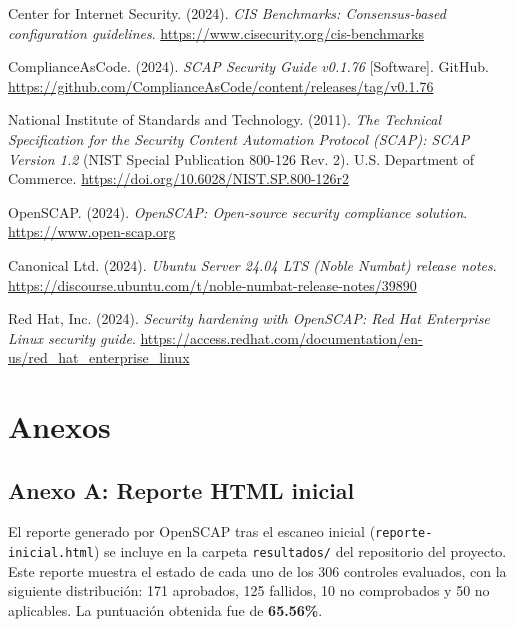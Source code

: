 \documentclass[12pt,letterpaper]{article}
\begin{document}
\begin{flushleft}
\setlength{\parindent}{0pt}
\setlength{\hangindent}{0.5in}

Center for Internet Security. (2024). \textit{CIS Benchmarks: Consensus-based configuration guidelines}. \url{https://www.cisecurity.org/cis-benchmarks}

\medskip

ComplianceAsCode. (2024). \textit{SCAP Security Guide v0.1.76} [Software]. GitHub. \url{https://github.com/ComplianceAsCode/content/releases/tag/v0.1.76}

\medskip

National Institute of Standards and Technology. (2011). \textit{The Technical Specification for the Security Content Automation Protocol (SCAP): SCAP Version 1.2} (NIST Special Publication 800-126 Rev. 2). U.S. Department of Commerce. \url{https://doi.org/10.6028/NIST.SP.800-126r2}

\medskip

OpenSCAP. (2024). \textit{OpenSCAP: Open-source security compliance solution}. \url{https://www.open-scap.org}

\medskip

Canonical Ltd. (2024). \textit{Ubuntu Server 24.04 LTS (Noble Numbat) release notes}. \url{https://discourse.ubuntu.com/t/noble-numbat-release-notes/39890}

\medskip

Red Hat, Inc. (2024). \textit{Security hardening with OpenSCAP: Red Hat Enterprise Linux security guide}. \url{https://access.redhat.com/documentation/en-us/red_hat_enterprise_linux}

\end{flushleft}

\section*{Anexos}

\subsection*{Anexo A: Reporte HTML inicial}

El reporte generado por OpenSCAP tras el escaneo inicial (\texttt{reporte-inicial.html}) se incluye en la carpeta \texttt{resultados/} del repositorio del proyecto. Este reporte muestra el estado de cada uno de los 306 controles evaluados, con la siguiente distribución: 171 aprobados, 125 fallidos, 10 no comprobados y 50 no aplicables. La puntuación obtenida fue de \textbf{65.56\%}.
\end{document}
